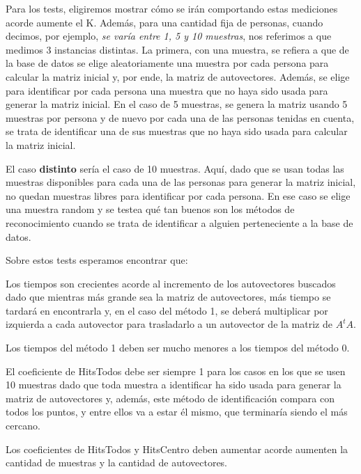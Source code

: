 Para los tests, eligiremos mostrar cómo se irán comportando estas mediciones acorde aumente el K.
Además, para una cantidad fija de personas, cuando decimos, por ejemplo, \textit{se varía
  entre 1, 5 y 10 muestras}, nos referimos a que medimos 3 instancias distintas. La primera, con una
muestra, se refiera a que de la base de datos se elige aleatoriamente una muestra por cada persona
para calcular la matriz inicial y, por ende, la matriz de autovectores. Además, se elige para
identificar por cada persona una muestra que no haya sido usada para generar la matriz inicial. En
el caso de 5 muestras, se genera la matriz usando 5 muestras por persona y de nuevo por cada una de
las personas tenidas en cuenta, se trata de identificar una de sus muestras que no haya sido usada
para calcular la matriz inicial.

El caso \textbf{distinto} sería el caso de 10 muestras. Aquí, dado que se usan todas las muestras
disponibles para cada una de las personas para generar la matriz inicial, no quedan muestras libres
para identificar por cada persona. En ese caso se elige una muestra random y se testea qué tan
buenos son los métodos de reconocimiento cuando se trata de identificar a alguien perteneciente a la
base de datos.



Sobre estos tests esperamos encontrar que:
\begin{compactitem}
  \item Los tiempos son crecientes acorde al incremento de los autovectores buscados dado que
  mientras más grande sea la matriz de autovectores, más tiempo se tardará en encontrarla y, en el
  caso del método 1, se deberá multiplicar por izquierda a cada autovector para trasladarlo a un
  autovector de la matriz de $A^t A$.
  \item Los tiempos del método 1 deben ser mucho menores a los tiempos del método 0.
  \item El coeficiente de HitsTodos debe ser siempre 1 para los casos en los que se usen 10 muestras
  dado que toda muestra a identificar ha sido usada para generar la matriz de autovectores y,
  además, este método de identificación compara con todos los puntos, y entre ellos va a estar él
  mismo, que terminaría siendo el más cercano.
  \item Los coeficientes de HitsTodos y HitsCentro deben aumentar acorde aumenten la cantidad de
  muestras y la cantidad de autovectores.
\end{compactitem}
